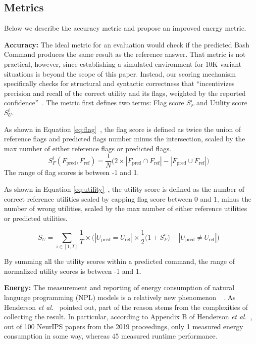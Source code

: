 \documentclass{river-journal}
\begin{document}
\subsection{Metrics} 
Below we describe the accuracy metric and propose an improved energy metric.

\label{metricerr.metric}
\textbf{Accuracy:} The ideal metric for an evaluation would check if the predicted Bash Command produces the same result as the reference answer. That metric is not practical, however, since establishing a simulated environment for 10K variant situations is beyond the scope of this paper. Instead, our scoring mechanism specifically checks for structural and syntactic correctness that ``incentivizes precision and recall of the correct utility and its flags, weighted by the reported confidence''~\cite{Agarwal2021NeurIPS2N}. The metric first defines two terms: Flag score ${S_{F}^{i}}$ and Utility score $S_{U}^{i}$. 

As shown in Equation \ref{eq:flag}~\cite{Agarwal2021NeurIPS2N}, the flag score is defined as twice the union of reference flags and predicted flags number minus the intersection, scaled by the max number of either reference flags or predicted flags. 
\begin{equation}
S_{F}^{i} (F_{\text{pred}}, F_{\text{ref}}) = \frac{1}{N} \Big( 2 \times |F_{\text{pred}} \cap F_{\text{ref}}| - |F_{\text{pred}} \cup F_{\text{ref}}| \Big)\label{eq:flag}
\end{equation}
The range of flag scores is between -1 and 1. 

As shown in Equation \ref{eq:utility}~\cite{Agarwal2021NeurIPS2N}, the utility score is defined as the number of correct reference utilities scaled by capping flag score between 0 and 1, minus the number of wrong utilities, scaled by the max number of either reference utilities or predicted utilities.
\begin{small}
\begin{equation}
S_{U} = \sum_{i \in [1, T]} \frac{1}{T} \times \bigg( |U_{\text{pred}} = U_{\text{ref}}| \times \frac{1}{2} \Big(1 + S_{F}^{i} \Big) - |U_{\text{pred}} \not= U_{\text{ref}} | \bigg)\label{eq:utility}
\end{equation}
\end{small}
By summing all the utility scores within a predicted command, the range of normalized utility scores is between -1 and 1.

\textbf{Energy:} The measurement and reporting of energy consumption of natural language programming (NPL) models is a relatively new phenomenon~\cite{Strubell2019EnergyAP}~\cite{Cao2020TowardsAA}. As Henderson \textit{et al.}~\cite{henderson2020systematic} pointed out, part of the reason stems from the complexities of collecting the result. In particular, according to Appendix B of Henderson \textit{et al.}~\cite{henderson2020systematic}, out of 100 NeurIPS papers from the 2019 proceedings, only 1 measured energy consumption in some way, whereas 45 measured runtime performance. 
\end{document}
